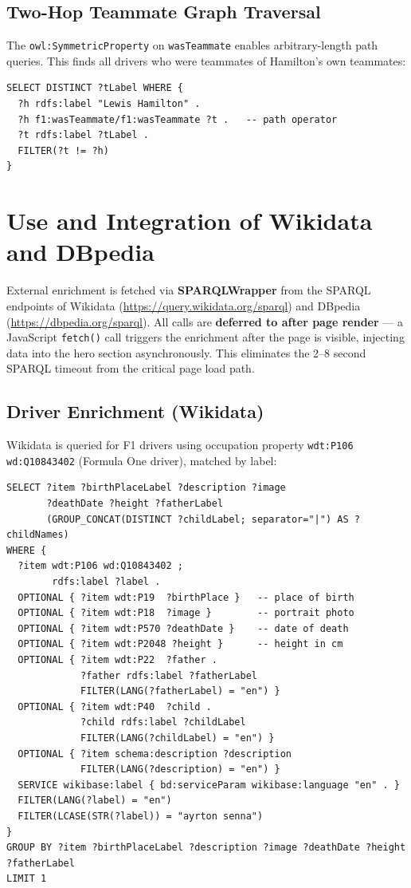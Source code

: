 \documentclass[12pt,a4paper]{article}
\begin{document}
\subsection{Two-Hop Teammate Graph Traversal}

The \texttt{owl:SymmetricProperty} on \texttt{wasTeammate} enables arbitrary-length
path queries. This finds all drivers who were teammates of Hamilton's own teammates:

\begin{lstlisting}[style=sparql, caption={Teammates of Hamilton's teammates (2-hop traversal)}]
SELECT DISTINCT ?tLabel WHERE {
  ?h rdfs:label "Lewis Hamilton" .
  ?h f1:wasTeammate/f1:wasTeammate ?t .   -- path operator
  ?t rdfs:label ?tLabel .
  FILTER(?t != ?h)
}
\end{lstlisting}

\section{Use and Integration of Wikidata and DBpedia}

External enrichment is fetched via \textbf{SPARQLWrapper} from the SPARQL endpoints
of Wikidata (\url{https://query.wikidata.org/sparql}) and DBpedia
(\url{https://dbpedia.org/sparql}). All calls are \textbf{deferred to after page
render} --- a JavaScript \texttt{fetch()} call triggers the enrichment after the
page is visible, injecting data into the hero section asynchronously.
This eliminates the 2--8 second SPARQL timeout from the critical page load path.

\subsection{Driver Enrichment (Wikidata)}

Wikidata is queried for F1 drivers using occupation property
\texttt{wdt:P106 wd:Q10843402} (Formula One driver), matched by label:

\begin{lstlisting}[style=sparql, caption={Wikidata query for driver enrichment with new fields}]
SELECT ?item ?birthPlaceLabel ?description ?image
       ?deathDate ?height ?fatherLabel
       (GROUP_CONCAT(DISTINCT ?childLabel; separator="|") AS ?childNames)
WHERE {
  ?item wdt:P106 wd:Q10843402 ;
        rdfs:label ?label .
  OPTIONAL { ?item wdt:P19  ?birthPlace }   -- place of birth
  OPTIONAL { ?item wdt:P18  ?image }        -- portrait photo
  OPTIONAL { ?item wdt:P570 ?deathDate }    -- date of death
  OPTIONAL { ?item wdt:P2048 ?height }      -- height in cm
  OPTIONAL { ?item wdt:P22  ?father .
             ?father rdfs:label ?fatherLabel
             FILTER(LANG(?fatherLabel) = "en") }
  OPTIONAL { ?item wdt:P40  ?child .
             ?child rdfs:label ?childLabel
             FILTER(LANG(?childLabel) = "en") }
  OPTIONAL { ?item schema:description ?description
             FILTER(LANG(?description) = "en") }
  SERVICE wikibase:label { bd:serviceParam wikibase:language "en" . }
  FILTER(LANG(?label) = "en")
  FILTER(LCASE(STR(?label)) = "ayrton senna")
}
GROUP BY ?item ?birthPlaceLabel ?description ?image ?deathDate ?height ?fatherLabel
LIMIT 1
\end{lstlisting}
\end{document}

